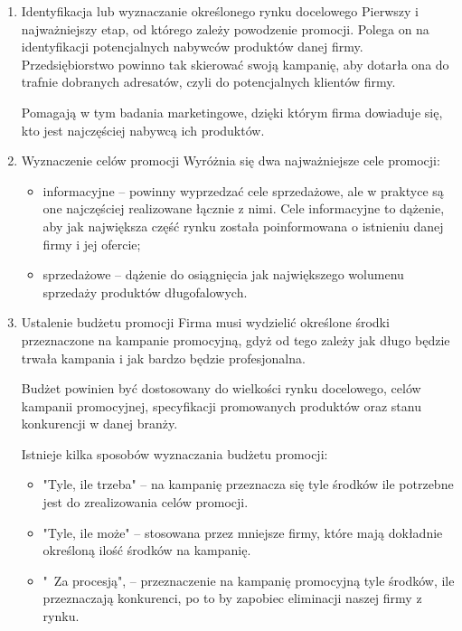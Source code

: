 \documentclass[a4paper, 12pt]{article}
\begin{document}
\begin{enumerate}
	\item Identyfikacja lub wyznaczanie określonego rynku docelowego
	\newline Pierwszy i najważniejszy etap, od którego zależy powodzenie promocji. Polega on na identyfikacji potencjalnych nabywców produktów danej firmy. Przedsiębiorstwo powinno tak skierować swoją kampanię, aby dotarła ona do trafnie dobranych adresatów, czyli do potencjalnych klientów firmy.
	
	Pomagają w tym badania marketingowe, dzięki którym firma dowiaduje się, kto jest najczęściej nabywcą ich produktów.

	\item Wyznaczenie celów promocji
	\newline Wyróżnia się dwa najważniejsze cele promocji:
	\begin{itemize}
		\item informacyjne – powinny wyprzedzać cele sprzedażowe, ale w praktyce są one najczęściej realizowane łącznie z nimi. Cele informacyjne to dążenie, aby jak największa część rynku została poinformowana o istnieniu danej firmy i jej ofercie;
		\item sprzedażowe – dążenie do osiągnięcia jak największego wolumenu sprzedaży produktów długofalowych.
	\end{itemize}
	\item Ustalenie budżetu promocji
	\newline Firma musi wydzielić określone środki przeznaczone na kampanie promocyjną, gdyż od tego zależy jak długo będzie trwała kampania i jak bardzo będzie profesjonalna.
	
	Budżet powinien być dostosowany do wielkości rynku docelowego, celów kampanii promocyjnej, specyfikacji promowanych produktów oraz stanu konkurencji w danej branży.
	
	Istnieje kilka sposobów wyznaczania budżetu promocji:
	\begin{itemize}
		\item "Tyle, ile trzeba" – na kampanię przeznacza się tyle środków ile potrzebne jest do zrealizowania celów promocji.
		\item "Tyle, ile może" – stosowana przez mniejsze firmy, które mają dokładnie określoną ilość środków na kampanię.
		\item "\ Za procesją", – przeznaczenie na kampanię promocyjną tyle środków, ile przeznaczają konkurenci, po to by zapobiec eliminacji naszej firmy z rynku.
	\end{itemize}


\end{enumerate}
\end{document}
